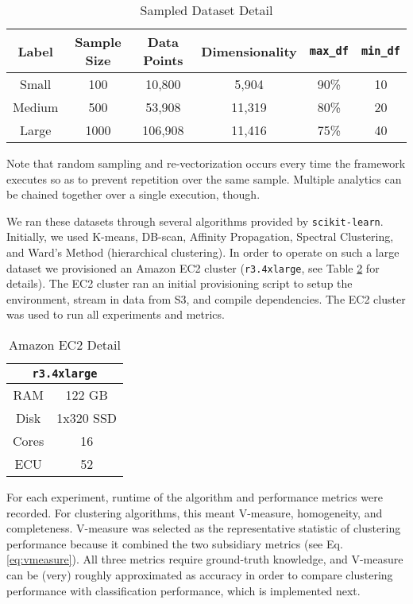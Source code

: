 \documentclass[letterpaper,10pt]{article}
\begin{document}
\begin{table}[ht]
\center
\begin{tabular}{cccccc}
Label & Sample Size & Data Points & Dimensionality & \texttt{max\_df} &
\texttt{min\_df} \\
\hline
Small & 100 & 10,800 & 5,904 & 90\% & 10 \\
Medium & 500 & 53,908 & 11,319 & 80\% & 20 \\
Large & 1000 & 106,908 & 11,416 & 75\% & 40 \\
\hline
\end{tabular}
\caption{Sampled Dataset Detail}
\label{tbl:tfidf}
\end{table}


\noindent
Note that random sampling and re-vectorization occurs every time the
framework executes so as to prevent repetition over the same sample.
Multiple analytics can be chained together over a single execution, though.

We ran these datasets through several algorithms provided by
\texttt{scikit-learn}. Initially, we used K-means, DB-scan, Affinity
Propagation, Spectral Clustering, and Ward's Method (hierarchical
clustering). In order to operate on such a large dataset we provisioned an
Amazon EC2 cluster (\texttt{r3.4xlarge}, see Table \ref{tbl:ec2} for
details). The EC2 cluster ran an initial provisioning script to setup the
environment, stream in data from S3, and compile dependencies. The EC2
cluster was used to run all experiments and metrics.


\begin{table}[ht]
\center
\begin{tabular}{cc}
\multicolumn{2}{c}{\texttt{r3.4xlarge}} \\
\hline
RAM & 122 GB \\
Disk & 1x320 SSD \\
Cores & 16 \\
ECU & 52 \\
\hline
\end{tabular}
\caption{Amazon EC2 Detail}
\label{tbl:ec2}
\end{table}


For each experiment, runtime of the algorithm and performance metrics were
recorded. For clustering algorithms, this meant V-measure, homogeneity, and
completeness.  V-measure was selected as the representative statistic of
clustering performance because it combined the two subsidiary metrics (see
Eq.  \ref{eq:vmeasure}). All three metrics require ground-truth knowledge,
and V-measure can be (very) roughly approximated as accuracy in order to
compare clustering performance with classification performance, which is
implemented next.
\end{document}
